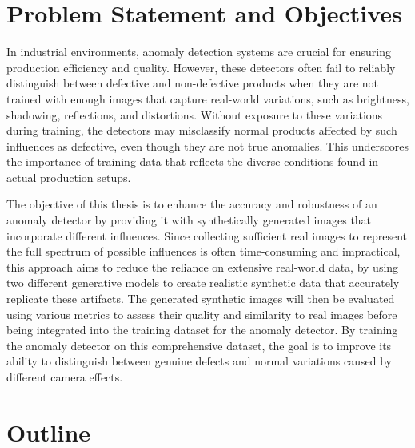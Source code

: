 \documentclass[12pt,DIV14,BCOR12mm,a4paper,footinclude=false,headinclude,parskip=half-,twoside,openright,cleardoublepage=empty,toc=index,bibliography=totoc,listof=totoc]{scrreprt}
\numberwithin{equation}{chapter}
\begin{document}
\section{Problem Statement and Objectives}
In industrial environments, anomaly detection systems are crucial for ensuring production efficiency and quality. However, these detectors often fail to reliably distinguish between defective and non-defective products when they are not trained with enough images that capture real-world variations, such as brightness, shadowing, reflections, and distortions. Without exposure to these variations during training, the detectors may misclassify normal products affected by such influences as defective, even though they are not true anomalies. This underscores the importance of training data that reflects the diverse conditions found in actual production setups.

The objective of this thesis is to enhance the accuracy and robustness of an anomaly detector by providing it with synthetically generated images that incorporate different influences. Since collecting sufficient real images to represent the full spectrum of possible influences is often time-consuming and impractical, this approach aims to reduce the reliance on extensive real-world data, by using two different generative models to create realistic synthetic data that accurately replicate these artifacts. The generated synthetic images will then be evaluated using various metrics to assess their quality and similarity to real images before being integrated into the training dataset for the anomaly detector. By training the anomaly detector on this comprehensive dataset, the goal is to improve its ability to distinguish between genuine defects and normal variations caused by different camera effects.

\section{Outline}
\end{document}
